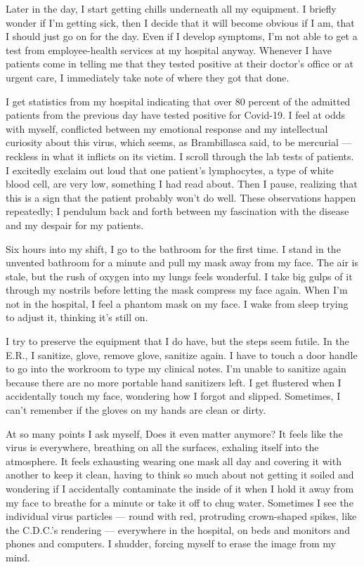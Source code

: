Later in the day, I start getting chills underneath all my equipment. I
briefly wonder if I'm getting sick, then I decide that it will become
obvious if I am, that I should just go on for the day. Even if I develop
symptoms, I'm not able to get a test from employee-health services at my
hospital anyway. Whenever I have patients come in telling me that they
tested positive at their doctor's office or at urgent care, I
immediately take note of where they got that done.

I get statistics from my hospital indicating that over 80 percent of the
admitted patients from the previous day have tested positive for
­Covid-19. I feel at odds with myself, conflicted between my emotional
response and my intellectual curiosity about this virus, which seems, as
Brambillasca said, to be mercurial --- reckless in what it inflicts on
its victim. I scroll through the lab tests of patients. I excitedly
exclaim out loud that one patient's lymphocytes, a type of white blood
cell, are very low, something I had read about. Then I pause, realizing
that this is a sign that the patient probably won't do well. These
observations happen repeatedly; I pendulum back and forth between my
fascination with the disease and my despair for my patients.

Six hours into my shift, I go to the bathroom for the first time. I
stand in the unvented bathroom for a minute and pull my mask away from
my face. The air is stale, but the rush of oxygen into my lungs feels
wonderful. I take big gulps of it through my nostrils before letting the
mask compress my face again. When I'm not in the hospital, I feel a
phantom mask on my face. I wake from sleep trying to adjust it, thinking
it's still on.

I try to preserve the equipment that I do have, but the steps seem
futile. In the E.R., I sanitize, glove, remove glove, sanitize again. I
have to touch a door handle to go into the workroom to type my clinical
notes. I'm unable to sanitize again because there are no more portable
hand sanitizers left. I get flustered when I accidentally touch my face,
wondering how I forgot and slipped. Sometimes, I can't remember if the
gloves on my hands are clean or dirty.

At so many points I ask myself, Does it even matter anymore? It feels
like the virus is everywhere, breathing on all the surfaces, exhaling
itself into the atmosphere. It feels exhausting wearing one mask all day
and covering it with another to keep it clean, having to think so much
about not getting it soiled and wondering if I accidentally contaminate
the inside of it when I hold it away from my face to breathe for a
minute or take it off to chug water. Sometimes I see the individual
virus particles --- round with red, protruding crown-shaped spikes, like
the C.D.C.'s rendering --- everywhere in the hospital, on beds and
monitors and phones and computers. I shudder, forcing myself to erase
the image from my mind.

